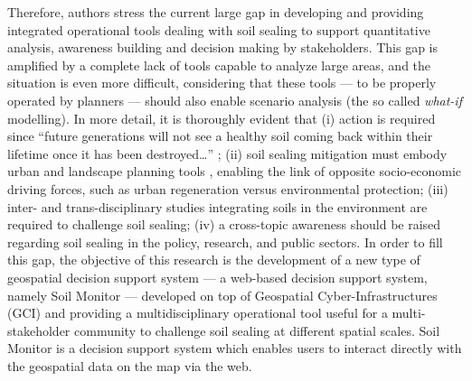 \documentclass[APA,LATO1COL,doublespace]{WileyNJD-v2}
\begin{document}
Therefore, authors stress the current
large gap in developing and providing integrated operational tools 
dealing with soil sealing 
to support quantitative analysis, awareness building and decision making by stakeholders.
This gap is amplified by a complete lack of tools 
capable to analyze large areas, and the situation is even more difficult, considering that these tools --- to be properly operated by planners --- should also enable scenario analysis (the so called \textit{what-if} modelling).
In more detail, it is thoroughly evident that 
(i) action is required since ``future generations will not see a healthy soil coming back within their lifetime once it has been destroyed\dots'' \citep{SWD12}; 
(ii) soil sealing mitigation must embody urban and landscape planning tools \citep{Artmann14}, enabling the link of opposite socio-economic driving forces, such as urban regeneration versus environmental protection; 
(iii) inter- and trans-disciplinary studies integrating soils in the environment are required to challenge soil sealing;
(iv) a cross-topic awareness should be raised regarding soil sealing in the policy, research, and public sectors.
In order to fill this gap, the objective of this research is the development of
a new type of geospatial decision support system --- a web-based decision support system, namely Soil Monitor --- developed on top of Geospatial Cyber-Infrastructures (GCI) and providing a multidisciplinary operational tool useful for a multi-stakeholder community to challenge soil sealing at different spatial scales.
Soil Monitor is a decision support system which enables users to interact directly with the geospatial data on the map via the web.
\end{document}
